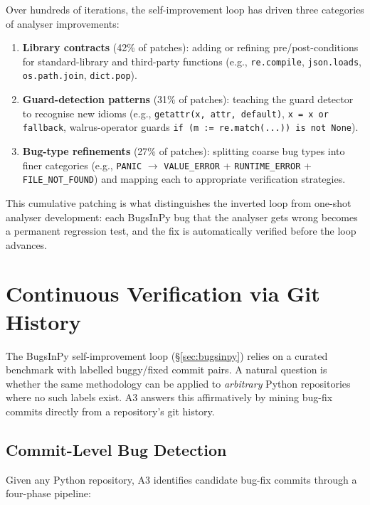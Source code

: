 \documentclass[sigconf,review,anonymous]{acmart}
\begin{document}
Over hundreds of iterations, the self-improvement loop has driven three categories of analyser improvements:

\begin{enumerate}
  \item \textbf{Library contracts} (42\% of patches): adding or refining pre/post-conditions for standard-library and third-party functions (e.g., \texttt{re.compile}, \texttt{json.loads}, \texttt{os.path.join}, \texttt{dict.pop}).
  \item \textbf{Guard-detection patterns} (31\% of patches): teaching the guard detector to recognise new idioms (e.g., \texttt{getattr(x, attr, default)}, \texttt{x = x or fallback}, walrus-operator guards \texttt{if (m := re.match(...)) is not None}).
  \item \textbf{Bug-type refinements} (27\% of patches): splitting coarse bug types into finer categories (e.g., \texttt{PANIC} $\to$ \texttt{VALUE\_ERROR} + \texttt{RUNTIME\_ERROR} + \texttt{FILE\_NOT\_FOUND}) and mapping each to appropriate verification strategies.
\end{enumerate}

This cumulative patching is what distinguishes the inverted loop from one-shot analyser development: each BugsInPy bug that the analyser gets wrong becomes a permanent regression test, and the fix is automatically verified before the loop advances.

\section{Continuous Verification via Git History}\label{sec:continuous}

The BugsInPy self-improvement loop (\S\ref{sec:bugsinpy}) relies on a curated benchmark with labelled buggy/fixed commit pairs.
A natural question is whether the same methodology can be applied to \emph{arbitrary} Python repositories where no such labels exist.
\textsc{A3} answers this affirmatively by mining bug-fix commits directly from a repository's git history.

\subsection{Commit-Level Bug Detection}

Given any Python repository, \textsc{A3} identifies candidate bug-fix commits through a four-phase pipeline:
\end{document}
